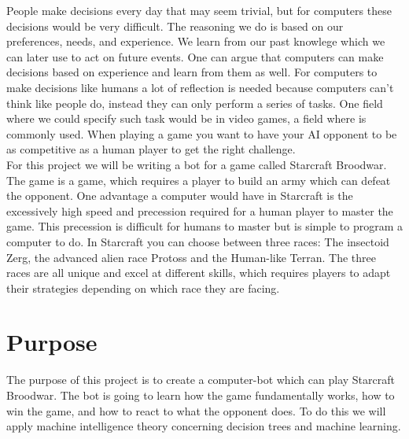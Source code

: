 People make decisions every day that may seem trivial, but for computers these decisions would be very difficult. The reasoning we do 
is based on our preferences, needs, and experience. We learn from our past knowlege which we can later use to act on future events. One can argue that computers can
make decisions based on experience and learn from them as well.
For computers to make decisions like humans a lot of reflection is needed because computers can't think like people do, instead they can only perform a series of tasks.
One field where we could specify such task would be in video games, a field where \abai is commonly used. When playing 
a game you want to have your AI opponent to be as competitive as a human player to get the right challenge. \\

For this project we will be writing a bot for a game called Starcraft Broodwar. The game is a \abrts game, which requires a player to build an army 
which can defeat the opponent. One advantage a computer would have in Starcraft is the excessively high speed and precession required for a human player to master the game. 
This precession is difficult for humans to master but is simple to program a computer to do.
In Starcraft you can choose between three races: The insectoid Zerg, the advanced alien race Protoss and the Human-like Terran. 
The three races are all unique and excel at different skills, which requires players to adapt their strategies depending on which race they are facing.


\section{Purpose}
	The purpose of this project is to create a computer-bot which can play Starcraft Broodwar. 
	The bot is going to learn how the game fundamentally works, 
	how to win the game, and how to react to what the opponent does. 
	To do this we will apply machine intelligence theory concerning decision trees and machine learning.


